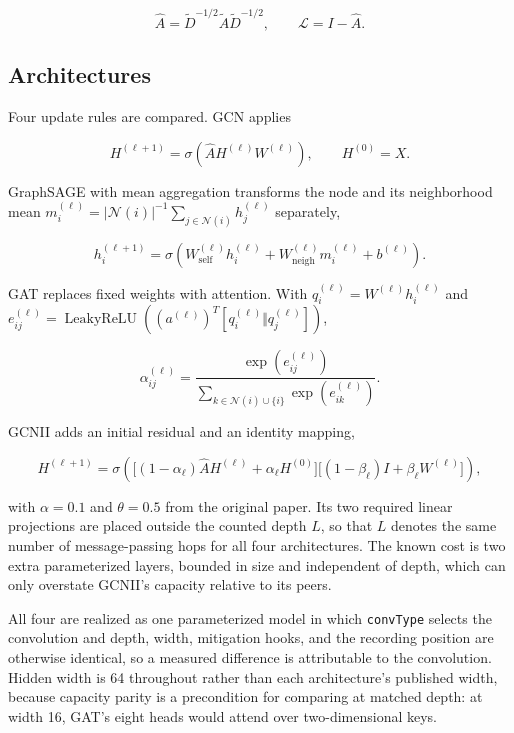 \documentclass[
  conference]{IEEEtran}
\begin{document}
\[
\widehat{A}=\widetilde{D}^{-1/2}\widetilde{A}\widetilde{D}^{-1/2},
\qquad
\mathcal{L}=I-\widehat{A}.
\]

\subsection{Architectures}\label{architectures}

Four update rules are compared. GCN \citep{kipf2017semi} applies

\[
H^{(\ell+1)}=\sigma\!\left(\widehat{A}H^{(\ell)}W^{(\ell)}\right),
\qquad H^{(0)}=X .
\]

GraphSAGE with mean aggregation \citep{hamilton2017inductive} transforms
the node and its neighborhood mean
\(m_i^{(\ell)}=|\mathcal{N}(i)|^{-1}\sum_{j\in\mathcal{N}(i)}h_j^{(\ell)}\)
separately,

\[
h_i^{(\ell+1)}=\sigma\!\left(W_{\mathrm{self}}^{(\ell)}h_i^{(\ell)}+W_{\mathrm{neigh}}^{(\ell)}m_i^{(\ell)}+b^{(\ell)}\right).
\]

GAT \citep{velickovic2018graph} replaces fixed weights with attention.
With \(q_i^{(\ell)}=W^{(\ell)}h_i^{(\ell)}\) and
\(e_{ij}^{(\ell)}=\operatorname{LeakyReLU}\!\left((a^{(\ell)})^{T}[q_i^{(\ell)}\Vert q_j^{(\ell)}]\right)\),

\[
\alpha_{ij}^{(\ell)}=\frac{\exp\!\left(e_{ij}^{(\ell)}\right)}{\sum_{k\in\mathcal{N}(i)\cup\{i\}}\exp\!\left(e_{ik}^{(\ell)}\right)} .
\]

GCNII \citep{chen2020simple} adds an initial residual and an identity
mapping,

\[
H^{(\ell+1)}=\sigma\!\left(\Big[(1-\alpha_\ell)\widehat{A}H^{(\ell)}+\alpha_\ell H^{(0)}\Big]\Big[(1-\beta_\ell)I+\beta_\ell W^{(\ell)}\Big]\right),
\]

with \(\alpha=0.1\) and \(\theta=0.5\) from the original paper. Its two
required linear projections are placed outside the counted depth \(L\),
so that \(L\) denotes the same number of message-passing hops for all
four architectures. The known cost is two extra parameterized layers,
bounded in size and independent of depth, which can only overstate
GCNII's capacity relative to its peers.

All four are realized as one parameterized model in which
\texttt{convType} selects the convolution and depth, width, mitigation
hooks, and the recording position are otherwise identical, so a measured
difference is attributable to the convolution. Hidden width is 64
throughout rather than each architecture's published width, because
capacity parity is a precondition for comparing at matched depth: at
width 16, GAT's eight heads would attend over two-dimensional keys.
\end{document}
